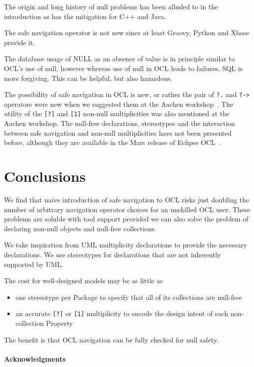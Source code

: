 \documentclass{llncs}
\begin{document}
The origin and long history of null problems has been alluded to in the introduction as has the mitigation for C++ and Java.

The safe navigation operator is not new since at least Groovy, Python and Xbase provide it.

The database usage of  NULL as an absence of value is in principle similar to OCL's use of null, however whereas use of null in OCL leads to failures, SQL is more forgiving. This can be helpful, but also hazardous.

The possibility of safe navigation in OCL is new, or rather the pair of \verb$?.$ and \verb$?->$ operators were new when we suggested them at the Aachen workshop~\cite{aachen}. The utility of the \verb$[?]$ and \verb$[1]$ non-null multiplicities was also mentioned at the Aachen workshop. The null-free declarations, stereotypes and the interaction between safe navigation and non-null multiplicities have not been presented before, although they are available in the Mars release of Eclipse OCL~\cite{Mars-OCL}. 
%
\section{Conclusions}\label{Conclusions}
%
We find that naive introduction of safe navigation to OCL risks just doubling the number of arbitrary navigation operator choices for an unskilled OCL user. These problems are soluble with tool support provided we can also solve the problem of declaring non-null objects and null-free collections.

We take inspiration from UML multiplicity declarations to provide the necessary declarations. We use stereotypes for declarations that are not inherently supported by UML.

The cost for well-designed models may be as little as 
\begin{itemize}
\item one stereotype per Package to specify that all of its collections are null-free
\item an accurate \verb$[?]$ or \verb$[1]$ multiplicity to encode the design intent of each non-collection Property
\end{itemize}

The benefit is that OCL navigation can be fully checked for null safety.

\paragraph{Acknowledgments}
\end{document}
